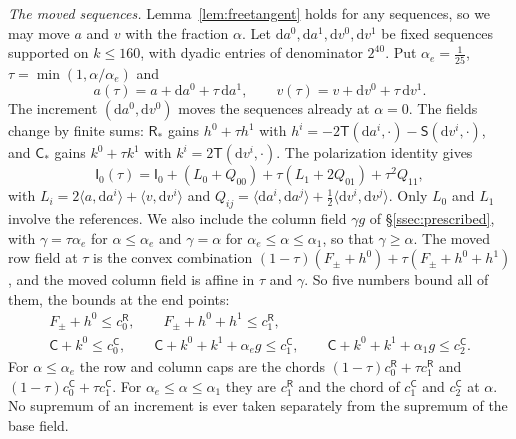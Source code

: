 \documentclass[11pt]{amsart}
\theoremstyle{definition}
\theoremstyle{remark}
\numberwithin{equation}{section}
\begin{document}
\emph{The moved sequences.} Lemma~\ref{lem:freetangent} holds for any sequences, so we may move $a$ and $v$ with the
fraction $\alpha$. Let $\mathrm da^0,\mathrm da^1,\mathrm dv^0,\mathrm dv^1$ be fixed sequences supported on $k\le160$, with
dyadic entries of denominator $2^{40}$. Put $\alpha_e=\frac1{25}$, $\tau=\min(1,\alpha/\alpha_e)$ and
\[
 a(\tau)=a+\mathrm da^0+\tau\,\mathrm da^1,\qquad v(\tau)=v+\mathrm dv^0+\tau\,\mathrm dv^1 .
\]
The increment $(\mathrm da^0,\mathrm dv^0)$ moves the sequences already at $\alpha=0$. The fields change by finite sums:
$\mathsf R_*$ gains $h^0+\tau h^1$ with $h^i=-2\mathsf T(\mathrm da^i,\cdot)-\mathsf S(\mathrm dv^i,\cdot)$, and $\mathsf C_*$ gains
$k^0+\tau k^1$ with $k^i=2\mathsf T(\mathrm dv^i,\cdot)$. The polarization identity gives
\[
 \mathsf I_0(\tau)=\mathsf I_0+(L_0+Q_{00})+\tau(L_1+2Q_{01})+\tau^2Q_{11},
\]
with $L_i=2\langle a,\mathrm da^i\rangle+\langle v,\mathrm dv^i\rangle$ and
$Q_{ij}=\langle\mathrm da^i,\mathrm da^j\rangle+\frac12\langle\mathrm dv^i,\mathrm dv^j\rangle$. Only $L_0$ and $L_1$ involve the
references. We also include the column field $\gamma g$ of \S\ref{ssec:prescribed}, with $\gamma=\tau\alpha_e$ for $\alpha\le\alpha_e$
and $\gamma=\alpha$ for $\alpha_e\le\alpha\le\alpha_1$, so that $\gamma\ge\alpha$. The moved row field at $\tau$ is the convex
combination $(1-\tau)(F_\pm+h^0)+\tau(F_\pm+h^0+h^1)$, and the moved column field is affine in $\tau$ and $\gamma$. So five
numbers bound all of them, the bounds at the end points:
\begin{gather*}
 F_\pm+h^0\le c^{\mathsf R}_0,\qquad F_\pm+h^0+h^1\le c^{\mathsf R}_1,\\
 \mathsf C+k^0\le c^{\mathsf C}_0,\qquad \mathsf C+k^0+k^1+\alpha_eg\le c^{\mathsf C}_1,\qquad \mathsf C+k^0+k^1+\alpha_1g\le c^{\mathsf C}_2 .
\end{gather*}
For $\alpha\le\alpha_e$ the row and column caps are the chords $(1-\tau)c^{\mathsf R}_0+\tau c^{\mathsf R}_1$ and
$(1-\tau)c^{\mathsf C}_0+\tau c^{\mathsf C}_1$. For $\alpha_e\le\alpha\le\alpha_1$ they are $c^{\mathsf R}_1$ and the chord of
$c^{\mathsf C}_1$ and $c^{\mathsf C}_2$ at $\alpha$. No supremum of an increment is ever taken separately from the supremum of the base field.
\end{document}
